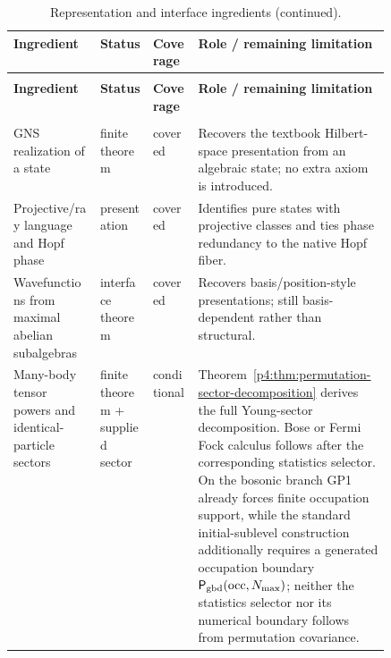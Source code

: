 \documentclass[12pt,a4paper]{article}
\begin{document}
\begin{xltabular}{\linewidth}{@{}
  >{\raggedright\arraybackslash}p{0.23\linewidth}
  >{\raggedright\arraybackslash}p{0.14\linewidth}
  >{\raggedright\arraybackslash}p{0.12\linewidth}
  >{\raggedright\arraybackslash}X
@{}}
\caption[Representation and interface ingredients]{Representation and interface ingredients.}
\label{p4:tab:part2-inventory}\\

\toprule
\textbf{Ingredient}
& \textbf{Status}
& \textbf{Coverage}
& \textbf{Role / remaining limitation} \\
\midrule
\endfirsthead

\caption[]{Representation and interface ingredients (continued).}\\
\toprule
\textbf{Ingredient}
& \textbf{Status}
& \textbf{Coverage}
& \textbf{Role / remaining limitation} \\
\midrule
\endhead

\midrule
{}\\
\bottomrule
\endfoot

\bottomrule
\endlastfoot

GNS realization of a state
& finite theorem
& covered
& Recovers the textbook Hilbert-space presentation from an algebraic state; no
extra axiom is introduced. \\

Projective/ray language and Hopf phase
& presentation
& covered
& Identifies pure states with projective classes and ties phase redundancy to
the native Hopf fiber. \\

Wavefunctions from maximal abelian subalgebras
& interface theorem
& covered
& Recovers basis/position-style presentations; still basis-dependent rather than
structural. \\

Many-body tensor powers and identical-particle sectors
& finite theorem + supplied sector
& conditional
& Theorem~\ref{p4:thm:permutation-sector-decomposition} derives the full
Young-sector decomposition.  Bose or Fermi Fock calculus follows after the
corresponding statistics selector.  On the bosonic branch GP1 already forces
finite occupation support, while the standard initial-sublevel construction
additionally requires a generated occupation boundary
\(\mathsf P_{\rm gbd}(\mathrm{occ},N_{\max})\); neither the statistics
selector nor its numerical boundary follows from permutation covariance. \\


\end{xltabular}
\end{document}

